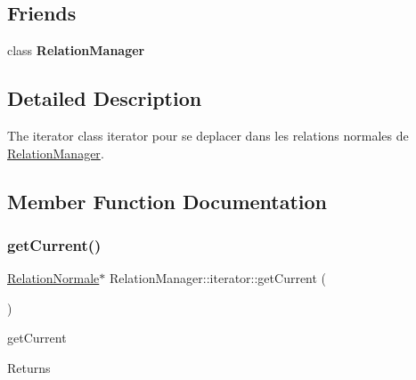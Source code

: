 \subsection*{Friends}
\begin{DoxyCompactItemize}
\item 
\mbox{\label{class_relation_manager_1_1iterator_a55fae9c2e48742dd0a8596e6d8721775}} 
class {\bfseries Relation\+Manager}
\end{DoxyCompactItemize}


\subsection{Detailed Description}
The iterator class iterator pour se deplacer dans les relations normales de \hyperlink{class_relation_manager}{Relation\+Manager}. 

\subsection{Member Function Documentation}
\mbox{\label{class_relation_manager_1_1iterator_a42d061ad754cc0441107c7699dbda256}} 
\subsubsection{\texorpdfstring{get\+Current()}{getCurrent()}}
{\footnotesize\ttfamily \hyperlink{class_relation_normale}{Relation\+Normale}$\ast$ Relation\+Manager\+::iterator\+::get\+Current (\begin{DoxyParamCaption}{ }\end{DoxyParamCaption})\hspace{0.3cm}{\ttfamily [inline]}}



get\+Current 

\begin{DoxyReturn}{Returns}

\end{DoxyReturn}
\mbox{\label{class_relation_manager_1_1iterator_a0f35589da6b054d5441547cf5e040b7f}} 
